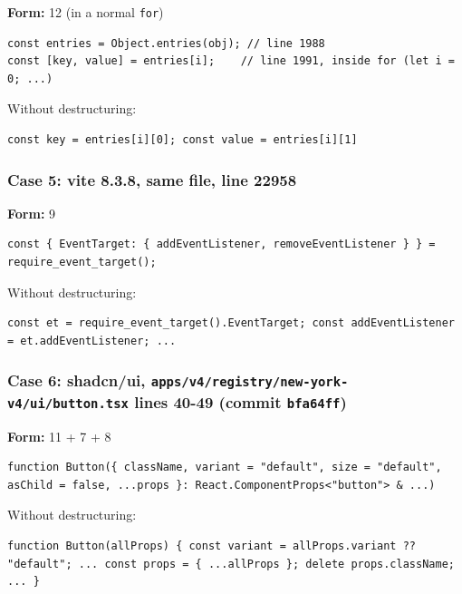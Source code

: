 \documentclass[
  11pt,
]{article}
\newcommand{\passthrough}[1]{#1}
\begin{document}
\textbf{Form:} 12 (in a normal \passthrough{\lstinline!for!})

\begin{lstlisting}
const entries = Object.entries(obj); // line 1988
const [key, value] = entries[i];    // line 1991, inside for (let i = 0; ...)
\end{lstlisting}

Without destructuring:

\begin{lstlisting}
const key = entries[i][0]; const value = entries[i][1]
\end{lstlisting}

\subsubsection{Case 5: vite 8.3.8, same file, line
22958}\label{case-5-vite-8.3.8-same-file-line-22958}

\textbf{Form:} 9

\begin{lstlisting}
const { EventTarget: { addEventListener, removeEventListener } } = require_event_target();
\end{lstlisting}

Without destructuring:

\begin{lstlisting}
const et = require_event_target().EventTarget; const addEventListener = et.addEventListener; ...
\end{lstlisting}

\subsubsection{\texorpdfstring{Case 6: shadcn/ui,
\texttt{apps/v4/registry/new-york-v4/ui/button.tsx} lines 40-49 (commit
\texttt{bfa64ff})}{Case 6: shadcn/ui, apps/v4/registry/new-york-v4/ui/button.tsx lines 40-49 (commit bfa64ff)}}\label{case-6-shadcnui-appsv4registrynew-york-v4uibutton.tsx-lines-40-49-commit-bfa64ff}

\textbf{Form:} 11 + 7 + 8

\begin{lstlisting}
function Button({ className, variant = "default", size = "default", asChild = false, ...props }: React.ComponentProps<"button"> & ...)
\end{lstlisting}

Without destructuring:

\begin{lstlisting}
function Button(allProps) { const variant = allProps.variant ?? "default"; ... const props = { ...allProps }; delete props.className; ... }
\end{lstlisting}
\end{document}
